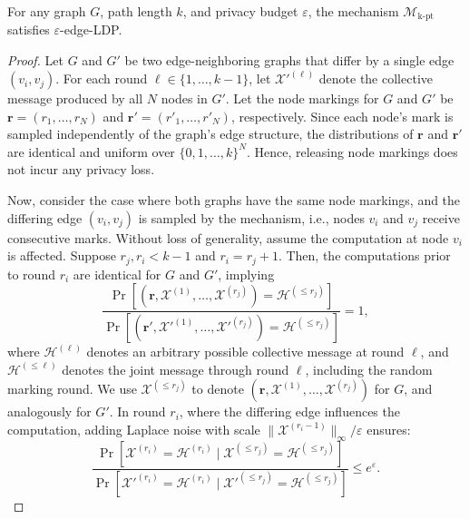 
\begin{theorem}
    For any graph $G$, path length $k$, and privacy budget $\varepsilon$, the mechanism $\mathcal{M}_{\mathrm{k\text{-}pt}}$ satisfies $\varepsilon$-edge-LDP.
\end{theorem}


\begin{proof}
Let $G$ and $G'$ be two edge-neighboring graphs that differ by a single edge $(v_i, v_j)$.  
For each round $\ell \in \{1, \dots, k-1\}$, let $\mathcal{X}'^{(\ell)}$ denote the collective message produced by all $N$ nodes in $G'$.  
Let the node markings for $G$ and $G'$ be $\mathbf{r}= (r_1, \dots, r_N)$ and $\mathbf{r}' = (r'_1, \dots, r'_N)$, respectively.  
Since each node's mark is sampled independently of the graph's edge structure, the distributions of $\mathbf{r}$ and $\mathbf{r}'$ are identical and uniform over $\{0, 1, \dots, k\}^N$.  
Hence, releasing node markings does not incur any privacy loss.



Now, consider the case where both graphs have the same node markings, and the differing edge $(v_i, v_j)$ is sampled by the mechanism, i.e., nodes $v_i$ and $v_j$ receive consecutive marks.  
Without loss of generality, assume the computation at node $v_i$ is affected.  
Suppose $r_j, r_i < k - 1$ and $r_i = r_j + 1$. Then, the computations prior to round $r_i$ are identical for $G$ and $G'$, implying
\begin{equation}
\label{e:pt_privacy_1}
     \frac{
    \Pr[ 
    (\mathbf{r}, \mathcal{X}^{(1)}, \dots, \mathcal{X}^{(r_j)}) = \mathcal{H}^{(\leq r_j)}
    ]
  }{
    \Pr[ (\mathbf{r}', \mathcal{X}'^{(1)}, \dots, \mathcal{X}'^{(r_j)}) = \mathcal{H}^{(\leq r_j)}
    ]
  } = 1,
\end{equation}
where $\mathcal{H}^{(\ell)}$ denotes an arbitrary possible collective message at round $\ell$, and $\mathcal{H}^{(\leq\ell)}$ denotes the joint message through round $\ell$, including the random marking round.
We use $\mathcal{X}^{(\leq r_j)}$ to denote $(\mathbf{r}, \mathcal{X}^{(1)}, \dots, \mathcal{X}^{(r_j)})$ for $G$, and analogously for $G'$.
In round $r_i$, where the differing edge influences the computation, adding Laplace noise with scale $\|\mathcal{X}^{(r_i - 1)}\|_\infty/\varepsilon$ ensures:
\begin{equation}
\label{e:pt_privacy_2}
    \frac{\Pr[\mathcal{X}^{(r_i)} = \mathcal{H}^{(r_i)} \mid 
    \mathcal{X}^{(\leq r_j)} = \mathcal{H}^{(\leq r_j)}]}
    {\Pr[\mathcal{X}'^{(r_i)} = \mathcal{H}^{(r_i)} \mid 
    \mathcal{X}'^{(\leq r_j)} = \mathcal{H}^{(\leq r_j)}]} \leq e^\varepsilon.
\end{equation}



\end{proof}
